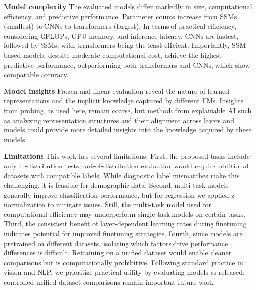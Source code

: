 \documentclass{article}
\newcommand{\heading}[1]{\noindent\textbf{#1}}
\begin{document}
    \heading{Model complexity}
    The evaluated models differ markedly in size, computational efficiency, and predictive performance. Parameter counts increase from SSMs (smallest) to CNNs to transformers (largest). In terms of practical efficiency, considering GFLOPs, GPU memory, and inference latency, CNNs are fastest, followed by SSMs, with transformers being the least efficient. Importantly, SSM-based models, despite moderate computational cost, achieve the highest predictive performance, outperforming both transformers and CNNs, which show comparable accuracy.
    
    \heading{Model insights} Frozen and linear evaluation reveal the nature of learned representations and the implicit knowledge captured by different FMs. Insights from probing, as used here, remain coarse, but methods from explainable AI such as analyzing representation structures and their alignment across layers and models \citep{vielhaben2024scalarsconceptbasedalignmentanalysis} could provide more detailed insights into the knowledge acquired by these models.    
    
    \heading{Limitations} This work has several limitations. First, the proposed tasks include only in-distribution tests; out-of-distribution evaluation would require additional datasets with compatible labels. While diagnostic label mismatches make this challenging, it is feasible for demographic data. Second, multi-task models generally improve classification performance, but for regression we applied z-normalization to mitigate issues. Still, the multi-task model used for computational efficiency may underperform single-task models on certain tasks. Third, the consistent benefit of layer-dependent learning rates during finetuning indicates potential for improved finetuning strategies. Fourth, since models are pretrained on different datasets, isolating which factors drive performance differences is difficult. Retraining on a unified dataset would enable cleaner comparisons but is computationally prohibitive. Following standard practice in vision and NLP, we prioritize practical utility by evaluating models as released; controlled unified-dataset comparisons remain important future work.
\end{document}
